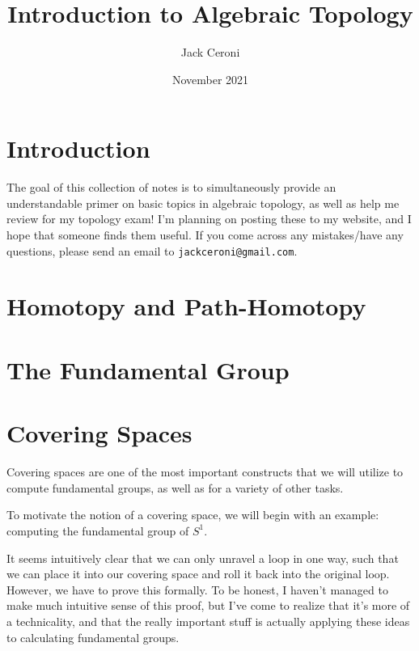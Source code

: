 \documentclass[10pt, oneside]{amsart}
\title{Introduction to Algebraic Topology}
\author{Jack Ceroni}
\date{November 2021}
\begin{document}
    \maketitle

    \tableofcontents

    \vspace{.25in}

    \newpage

    \section{Introduction}

    The goal of this collection of notes is to simultaneously provide an understandable primer on basic topics in algebraic topology, as well as help me review for my topology exam! I'm planning on posting
    these to my website, and I hope that someone finds them useful. If you come across any mistakes/have any questions, please send an email to \texttt{jackceroni@gmail.com}.

    \section{Homotopy and Path-Homotopy}

    \section{The Fundamental Group}

    \section{Covering Spaces}

    Covering spaces are one of the most important constructs that we will utilize to compute fundamental groups, as well as for a variety of other tasks.
    \newline

    To motivate the notion of a covering space, we will begin with an example: computing the fundamental group of $S^1$.
    \newline

    It seems intuitively clear that we can only unravel a loop in one way, such that we can place it into our covering space and roll it back into the original loop. However, we have to prove this formally. To be honest,
    I haven't managed to make much intuitive sense of this proof, but I've come to realize that it's more of a technicality, and that the really important stuff is actually applying these ideas to calculating fundamental groups.
    \newline
\end{document}
